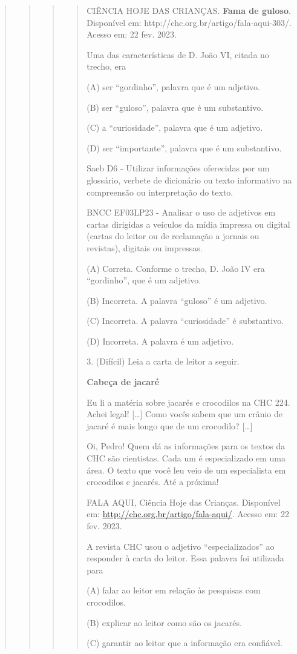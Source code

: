 \begin{quote}
\begin{quote}
\begin{quote}
\begin{quote}
CIÊNCIA HOJE DAS CRIANÇAS. \textbf{Fama de guloso}. Disponível em:
http://chc.org.br/artigo/fala-aqui-303/. Acesso em: 22 fev. 2023.

Uma das características de D. João VI, citada no trecho, era

(A) ser ``gordinho'', palavra que é um adjetivo.

(B) ser ``guloso'', palavra que é um substantivo.

(C) a ``curiosidade'', palavra que é um adjetivo.

(D) ser ``importante'', palavra que é um substantivo.

Saeb D6 - Utilizar informações oferecidas por um glossário, verbete de
dicionário ou texto informativo na compreensão ou interpretação do
texto.

BNCC EF03LP23 - Analisar o uso de adjetivos em cartas dirigidas a
veículos da mídia impressa ou digital (cartas do leitor ou de reclamação
a jornais ou revistas), digitais ou impressas.

(A) Correta. Conforme o trecho, D. João IV era ``gordinho'', que é um
adjetivo.

(B) Incorreta. A palavra ``guloso'' é um adjetivo.

(C) Incorreta. A palavra ``curiosidade'' é substantivo.

(D) Incorreta. A palavra é um adjetivo.

3. (Difícil) Leia a carta de leitor a seguir.

\textbf{Cabeça de jacaré}

Eu li a matéria sobre jacarés e crocodilos na CHC 224. Achei legal!
{[}\ldots{}{]} Como vocês sabem que um crânio de jacaré é mais longo que
de um crocodilo? {[}\ldots{}{]}

Oi, Pedro! Quem dá as informações para os textos da CHC são cientistas.
Cada um é especializado em uma área. O texto que você leu veio de um
especialista em crocodilos e jacarés. Até a próxima!

FALA AQUI, Ciência Hoje das Crianças. Disponível em:
\url{http://chc.org.br/artigo/fala-aqui/}. Acesso em: 22 fev. 2023.

A revista CHC usou o adjetivo ``especializados'' ao responder à carta do
leitor. Essa palavra foi utilizada para

(A) falar ao leitor em relação às pesquisas com crocodilos.

(B) explicar ao leitor como são os jacarés.

(C) garantir ao leitor que a informação era confiável.


\end{quote}
\end{quote}
\end{quote}
\end{quote}
